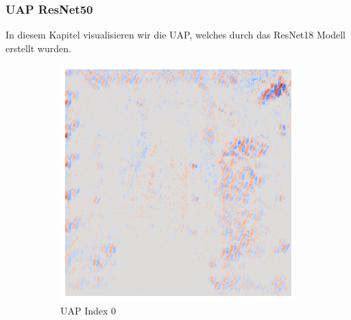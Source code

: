 \subsubsection{UAP ResNet50}
In diesem Kapitel visualisieren wir die UAP, welches durch das ResNet18 Modell erstellt wurden.

\begin{figure}[ht!]
    \centering
    \begin{subfigure}{0.19\linewidth}
        \centering
        \includegraphics[height=1\linewidth]{01-images/05-resultate/uap_resnet/uap0-resnet18-covid-n200-robustificationslevel0.png}
        \caption{UAP Index 0}
    \end{subfigure}\hfill%
    \begin{subfigure}{0.19\linewidth}
        \centering

\end{subfigure}
\end{figure}

